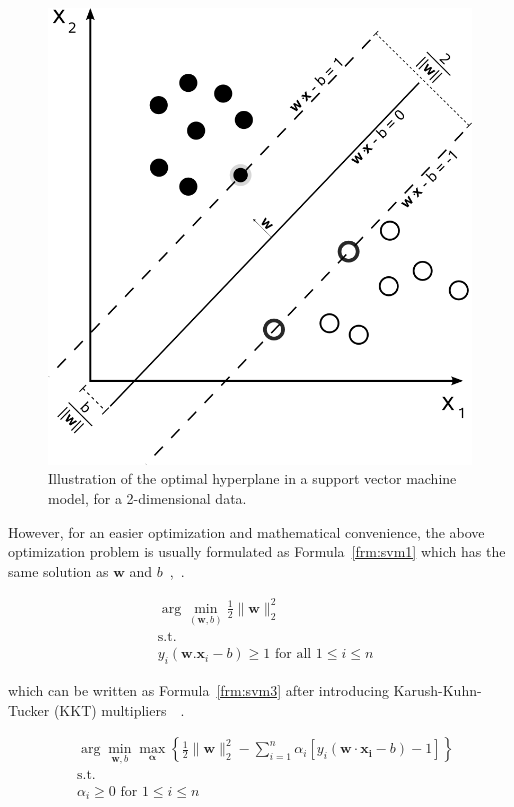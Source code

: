 \begin{figure}[!ht]
  \centering
  \includegraphics[width=.5\textwidth]{figs/background/Svm_max_sep_hyperplane_with_margin}
  \caption{Illustration of the optimal hyperplane in a support vector machine model, for a 2-dimensional data.}
  \label{fig:svm-hyperplane}
\end{figure}

However, for an easier optimization and mathematical convenience, the above optimization problem is usually formulated as Formula~\ref{frm:svm1} which has the same solution as $\mathbf{w}$ and $b$~\cite[Ch. 5]{thenatureofstatisticallearningtheory},~\cite[Ch. 7]{learning-with-kernels}.

\begin{align}
  &\arg\min_{(\mathbf{w},b)}\frac{1}{2}\|\mathbf{w}\|_2^2 \nonumber \\
  &\text{s.t.} \nonumber \\
  &y_i (\mathbf{w} . \mathbf{x}_i - b)\geq 1 \text{ for all } 1 \leq i \leq n
  \label{frm:svm1}
\end{align}

which can be written as Formula~\ref{frm:svm3} after introducing Karush-Kuhn-Tucker (KKT) multipliers~\cite{kkt-orig}~\cite[Ch. 5]{thenatureofstatisticallearningtheory}.

\begin{align}
  &\arg\min_{\mathbf{w},b } \max_{\boldsymbol{\alpha}} \left\{ \frac{1}{2}\|\mathbf{w}\|_2^2 - \sum_{i=1}^{n}{\alpha_i[y_i(\mathbf{w}\cdot \mathbf{x_i} - b)-1]} \right\} \nonumber \\
  &\text{s.t.} \nonumber \\
  &\alpha_i \geq 0 \text{ for } 1 \leq i \leq n \nonumber \\
  \label{frm:svm3}
\end{align}


